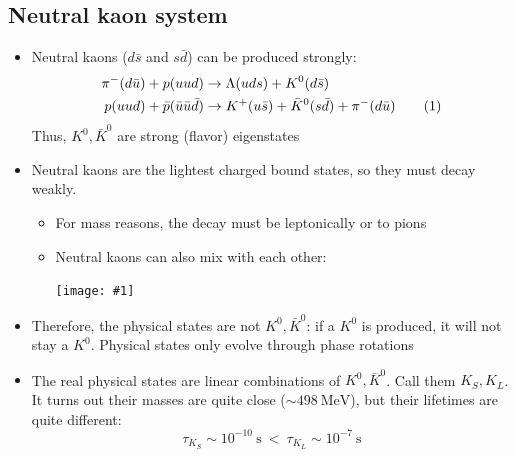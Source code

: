 \documentclass[11pt]{article}
\newcommand\numberthis{\addtocounter{equation}{1}\tag{\theequation}}
\newcommand{\ubar}{\bar{u}}
\newcommand{\sbar}{\bar{s}}
\newcommand{\dbar}{\bar{d}}
\newcommand{\s}{\text{s}}
\newcommand{\mev}{\text{MeV}}
\newcommand{\embedimgw}[2]{\begin{center}\texttt{[image: \#1]}\end{center}}
\begin{document}
  \subsection{Neutral kaon system}
  \begin{itemize}
    \item Neutral kaons ($d\sbar$ and $s\dbar$) can be produced strongly:
    \begin{align*}
      \pi^-(d\ubar) + p(uud) &\rightarrow \Lambda(uds)+K^0(d\sbar)\\
      p(uud)+\bar p(\ubar\ubar\dbar) &\rightarrow K^+(u\sbar) + \bar K^0 (s\dbar) + \pi^-(d\ubar)\numberthis
    \end{align*}
    Thus, $K^0,\bar K^0$ are strong (flavor) eigenstates
    \item Neutral kaons are the lightest charged bound states, so they must decay weakly.
    \begin{itemize}
      \item For mass reasons, the decay must be leptonically or to pions
      \item Neutral kaons can also mix with each other:
      \embedimgw{figs/kaonmixing.png}{.7}
    \end{itemize}
    \item Therefore, the physical states are not $K^0, \bar K^0$: if a $K^0$ is produced, it will not stay a $K^0$. Physical states only evolve through phase rotations
    \item The real physical states are linear combinations of $K^0,\bar K^0$. Call them $K_S,K_L$. It turns out their masses are quite close ($\sim 498~\mev$), but their lifetimes are quite different:
    \begin{equation}
      \tau_{K_S} \sim 10^{-10}~\s ~< ~\tau_{K_L} \sim 10^{-7}~\s
    \end{equation}
  \end{itemize}
\end{document}

